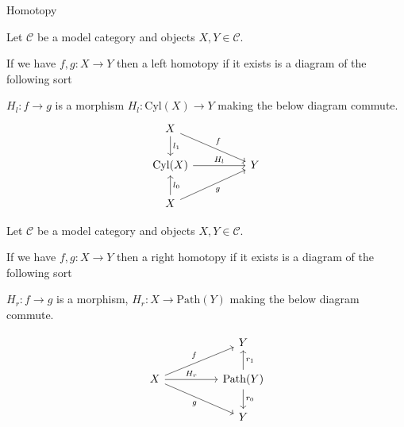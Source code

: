 \documentclass[10pt]{beamer}
\newcounter{dummy} \numberwithin{dummy}{section}
\newtheorem{proposition}[dummy]{Proposition}
\begin{document}
\begin{frame}{Homotopy}
\begin{example}
	\end{example}
	
%		
%	
		\begin{definition}
		Let $\mathcal{C}$ be a model category and objects $X,Y \in \mathcal{C}$.
		
		If we have \( f, g: X \to Y \) then a left homotopy if it exists is a diagram of the following sort 
		
		\( H_l: f \rightarrow g \) is a morphism \( H_l: \mathrm{Cyl}(X) \to Y \) making the below diagram commute.
		\[\begin{tikzcd}
			X \\
			{\mathrm{Cyl}(X)} && Y \\
			X
			\arrow["{l_1}", from=1-1, to=2-1]
			\arrow["f", from=1-1, to=2-3]
			\arrow["{H_l}", from=2-1, to=2-3]
			\arrow["{l_0}"', from=3-1, to=2-1]
			\arrow["g"', from=3-1, to=2-3]
		\end{tikzcd}\]
		
	\end{definition}
	\begin{definition}
		Let $\mathcal{C}$ be a model category and objects $X,Y \in \mathcal{C}$.
		
		If we have \( f, g: X \to Y \) then a right homotopy if it exists is a diagram of the following sort 
		
		\( H_r: f \rightarrow g \) is a morphism, \( H_r: X \to \mathrm{Path}(Y) \) making the below diagram commute.
		
		\[\begin{tikzcd}
			&& Y \\
			X && {\mathrm{Path}(Y)} \\
			&& Y
			\arrow["{r_1}"', from=2-3, to=1-3]
			\arrow["f", from=2-1, to=1-3]
			\arrow["{H_r}", from=2-1, to=2-3]
			\arrow["g"', from=2-1, to=3-3]
			\arrow["{r_0}", from=2-3, to=3-3]
		\end{tikzcd}\]
	\end{definition}
	

\end{frame}
\end{document}

